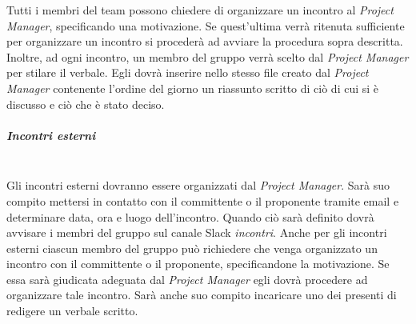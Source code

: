 			Tutti i membri del team possono chiedere di organizzare un incontro al \emph{Project Manager}, specificando una motivazione. Se quest'ultima verrà ritenuta sufficiente per organizzare un incontro si procederà ad avviare la procedura sopra descritta. 
			\\Inoltre, ad ogni incontro, un membro del gruppo verrà scelto dal \emph{Project Manager} per stilare il verbale. Egli dovrà inserire nello stesso file creato dal \emph{Project Manager} contenente l'ordine del giorno un riassunto scritto di ciò di cui si è discusso e ciò che è stato deciso.
			
			\subparagraph{Incontri esterni} \mbox{} \\
			 Gli incontri esterni dovranno essere organizzati dal \emph{Project Manager}. Sarà suo compito mettersi in contatto con il committente o il proponente tramite email e determinare data, ora e luogo dell'incontro. Quando ciò sarà definito dovrà avvisare i membri del gruppo sul canale Slack \emph{incontri}. Anche per gli incontri esterni ciascun membro del gruppo può richiedere che venga organizzato un incontro con il committente o il proponente, specificandone la motivazione. Se essa sarà giudicata adeguata dal \emph{Project Manager} egli dovrà procedere ad organizzare tale incontro. Sarà anche suo compito incaricare uno dei presenti di redigere un verbale scritto.

